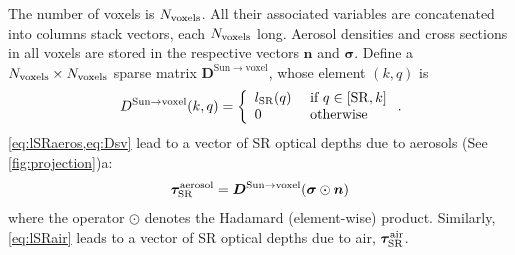 \documentclass[10pt,letterpaper]{article}
\newcommand{\vect}[1]{\bm{#1}}
\begin{document}
The number of voxels is $N_{\rm voxels}$. All their associated
variables are concatenated into columns stack vectors, each $N_{\rm
  voxels}$ long. Aerosol densities and cross sections in all voxels
are stored in the respective vectors ${\bm n}$ and
$\vect{\sigma}$. Define a $N_{\rm voxels}\times N_{\rm voxels}$ sparse
matrix ${\bm D}^{\mathrm{Sun \rightarrow voxel}}$, whose element
$(k,q)$ is
\begin{equation}
  D^{\mathrm{Sun \rightarrow voxel}}(k,q) =
  \left\{
    \begin{array}{ll}
      l_{\rm SR}(q) & \mbox{ if $q \in[{\rm SR},k]$} \\
      0  & \mbox{ otherwise}
      \label{eq:Dsv}
    \end{array}
  \right.
  .
  \hspace{-0.05cm}
\end{equation}
\cref{eq:lSRaeros,eq:Dsv} lead to a vector of SR optical depths due to
aerosols (See \cref{fig:projection})a:
\begin{equation}
  \vect{\tau}_{\rm SR}^{\rm aerosol}=
  {\bm D}^{\mathrm{Sun \rightarrow voxel}}
  (\vect{\sigma} \odot {\bm n})
  \label{eq:tauSRvec1}
\end{equation}
where the operator $\odot$ denotes the Hadamard (element-wise)
product. Similarly, \cref{eq:lSRair} leads to a vector of SR optical
depths due to air, $\vect{\tau}_{\rm SR}^{\rm air}$.
\end{document}
